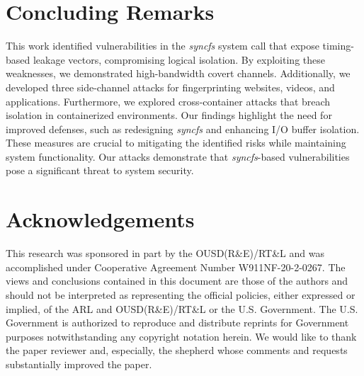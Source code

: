 \section{Concluding Remarks}

This work identified vulnerabilities in the \textit{syncfs} system call that expose timing-based leakage vectors, compromising logical isolation. By exploiting these weaknesses, we demonstrated high-bandwidth covert channels. Additionally, we developed three side-channel attacks for fingerprinting websites, videos, and applications. Furthermore, we explored cross-container attacks that breach isolation in containerized environments. Our findings highlight the need for improved defenses, such as redesigning \textit{syncfs} and enhancing I/O buffer isolation. These measures are crucial to mitigating the identified risks while maintaining system functionality.
Our attacks demonstrate that \textit{syncfs}-based vulnerabilities pose a significant threat to system security.

\section*{Acknowledgements}
This research was sponsored in part by the OUSD(R\&E)/RT\&L and was accomplished under Cooperative Agreement Number W911NF-20-2-0267. The views and conclusions contained in this document are those of the authors and should not be interpreted as representing the official policies, either expressed or implied, of the ARL and OUSD(R\&E)/RT\&L or the U.S. Government. The U.S. Government is authorized to reproduce and distribute reprints for Government purposes notwithstanding any copyright notation herein.  We would like to thank the paper reviewer and, especially, the shepherd whose comments and requests substantially improved the paper.



